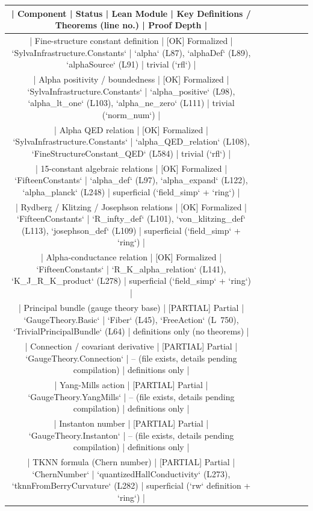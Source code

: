 \documentclass[11pt,a4paper]{article}
\theoremstyle{plain}
\theoremstyle{definition}
\begin{document}
\begin{table}[h]
\centering
\begin{tabular}{|c|c|c|c|c|c|c|}
\hline
| Component | Status | Lean Module | Key Definitions / Theorems (line no.) | Proof Depth | \\ \hline
| Fine-structure constant definition | [OK] Formalized | `SylvaInfrastructure.Constants` | `alpha` (L87), `alphaDef` (L89), `alphaSource` (L91) | trivial (`rfl`) | \\ \hline
| Alpha positivity / boundedness | [OK] Formalized | `SylvaInfrastructure.Constants` | `alpha_positive` (L98), `alpha_lt_one` (L103), `alpha_ne_zero` (L111) | trivial (`norm_num`) | \\ \hline
| Alpha QED relation | [OK] Formalized | `SylvaInfrastructure.Constants` | `alpha_QED_relation` (L108), `FineStructureConstant_QED` (L584) | trivial (`rfl`) | \\ \hline
| 15-constant algebraic relations | [OK] Formalized | `FifteenConstants` | `alpha_def` (L97), `alpha_expand` (L122), `alpha_planck` (L248) | superficial (`field_simp` + `ring`) | \\ \hline
| Rydberg / Klitzing / Josephson relations | [OK] Formalized | `FifteenConstants` | `R_infty_def` (L101), `von_klitzing_def` (L113), `josephson_def` (L109) | superficial (`field_simp` + `ring`) | \\ \hline
| Alpha-conductance relation | [OK] Formalized | `FifteenConstants` | `R_K_alpha_relation` (L141), `K_J_R_K_product` (L278) | superficial (`field_simp` + `ring`) | \\ \hline
| Principal bundle (gauge theory base) | [PARTIAL] Partial | `GaugeTheory.Basic` | `Fiber` (L45), `FreeAction` (L~750), `TrivialPrincipalBundle` (L64) | definitions only (no theorems) | \\ \hline
| Connection / covariant derivative | [PARTIAL] Partial | `GaugeTheory.Connection` | -- (file exists, details pending compilation) | definitions only | \\ \hline
| Yang-Mills action | [PARTIAL] Partial | `GaugeTheory.YangMills` | -- (file exists, details pending compilation) | definitions only | \\ \hline
| Instanton number | [PARTIAL] Partial | `GaugeTheory.Instanton` | -- (file exists, details pending compilation) | definitions only | \\ \hline
| TKNN formula (Chern number) | [PARTIAL] Partial | `ChernNumber` | `quantizedHallConductivity` (L273), `tknnFromBerryCurvature` (L282) | superficial (`rw` definition + `ring`) | \\ \hline

\end{tabular}
\end{table}
\end{document}
